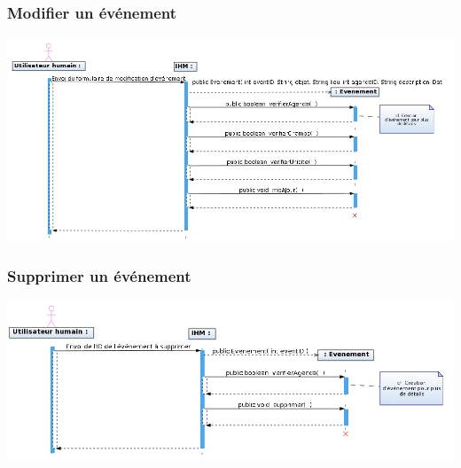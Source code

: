 \documentclass[12pt , a4paper]{article}
\begin{document}
\begin{landscape}
\subsubsection{Modifier un événement}
\begin{center}
  \includegraphics[scale=0.55]{./images/diag_seq_modifier_evt.jpg}
\end{center}
\end{landscape}

\begin{landscape}
\subsubsection{Supprimer un événement}
\begin{center}
  \includegraphics[scale=0.55]{./images/diag_seq_supprimer_evt.jpg}
\end{center}
\end{landscape}
\end{document}
